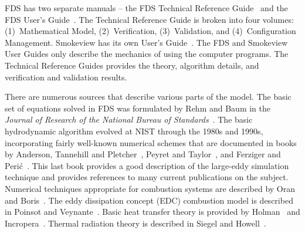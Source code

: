 \documentclass[11pt]{book}
\begin{document}
FDS has two separate manuals -- the FDS Technical Reference Guide~\cite{FDS_Tech_Guide} and the FDS User's Guide~\cite{FDS_Users_Guide}. The Technical Reference Guide is broken into four volumes: (1)~Mathematical Model, (2)~Verification, (3)~Validation, and (4)~Configuration Management. Smokeview has its own User's Guide~\cite{Smokeview_Users_Guide}. The FDS and Smokeview User Guides only describe the mechanics of using the computer programs. The Technical Reference Guides provides the theory, algorithm details, and verification and validation results.

There are numerous sources that describe various parts of the model. The basic set of equations solved in FDS was formulated by Rehm and Baum in the {\em Journal of Research of the National Bureau of Standards}~\cite{Rehm:1}.  The basic hydrodynamic algorithm evolved at NIST through the 1980s and 1990s, incorporating fairly well-known numerical schemes that are documented in books by Anderson, Tannehill and Pletcher~\cite{Anderson:1}, Peyret and Taylor~\cite{Peyret:1}, and Ferziger and Peri\'{c}~\cite{Ferziger:1}. This last book provides a good description of the large-eddy simulation technique and provides references to many current publications on the subject.  Numerical techniques appropriate for combustion systems are described by Oran and Boris~\cite{Oran:1}.  The eddy dissipation concept (EDC) combustion model is described in Poinsot and Veynante~\cite{Poinsot:TNC}. Basic heat transfer theory is provided by Holman~\cite{Holman:1} and Incropera~\cite{Incropera:1}. Thermal radiation theory is described in Siegel and Howell~\cite{Siegel:1}.
\end{document}
